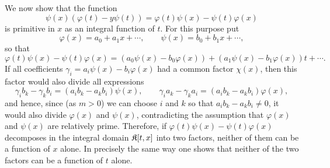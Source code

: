 We now show that the function
\[
\psi(x)(\varphi(t)-y\psi(t))=\varphi(t)\psi(x)-\psi(t)\varphi(x)
\]
is primitive in \(x\) as an integral function of \(t\). For this purpose put
\[
\varphi(x)=a_0+a_1x+\cdots,\qquad \psi(x)=b_0+b_1x+\cdots,
\]
so that
\[
\varphi(t)\psi(x)-\psi(t)\varphi(x)=(a_0\psi(x)-b_0\varphi(x))+(a_1\psi(x)-b_1\varphi(x))t+\cdots.
\]
If all coefficients \(\gamma_i=a_i\psi(x)-b_i\varphi(x)\) had a common factor \(\chi(x)\), then this factor would also divide all expressions
\[
\gamma_i b_k-\gamma_k b_i=(a_i b_k-a_k b_i)\psi(x),
\qquad
\gamma_i a_k-\gamma_k a_i=(a_i b_k-a_k b_i)\varphi(x),
\]
and hence, since (as \(m>0\)) we can choose \(i\) and \(k\) so that \(a_i b_k-a_k b_i\neq0\), it would also divide \(\varphi(x)\) and \(\psi(x)\), contradicting the assumption that \(\varphi(x)\) and \(\psi(x)\) are relatively prime. Therefore, if \(\varphi(t)\psi(x)-\psi(t)\varphi(x)\) decomposes in the integral domain \(\mathfrak K[t,x]\) into two factors, neither of them can be a function of \(x\) alone. In precisely the same way one shows that neither of the two factors can be a function of \(t\) alone.

